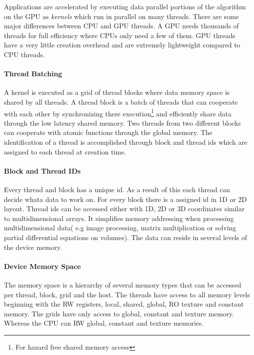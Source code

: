 Applications are accelerated by executing data parallel portions of the
algorithm on the \gls{GPU} as \emph{kernels} which run in parallel on many
threads. There are some major differences between \gls{CPU} and
\gls{GPU} threads. A \gls{GPU} needs thousands of threads for full efficiency
where \glspl{CPU} only need a few of them. \Gls{GPU} threads have a very little
creation overhead and are extremely lightweight compared to \gls{CPU} threads.

\paragraph{Thread Batching}%
\label{par:thread_batching} 
A kernel is executed as a grid of thread blocks where data memory space is
shared by all threads. A thread block is a batch of threads that can cooperate
with each other by synchronizing there execution\footnote{For hazard free shared
memory access} and efficiently share data through the low latency shared
memory. Two threads from two different blocks can cooperate with atomic 
functions through the global memory. The identification of a thread is 
accomplished through block and thread ids which are assigned to each thread at 
creation time. 

\paragraph{Block and Thread IDs}%
\label{par:block_and_thread_ids} 
Every thread and block has a unique id. As a result of this each thread can
decide whata data to work on. For every block there is a assigned id in \gls{1D}
or \gls{2D} layout. Thread ids can be accessed either with \gls{1D}, \gls{2D} or
\gls{3D} coordinates similar to multidimensional arrays. It simplifies memory
addressing when processing multidimensional data( e.g image processing, matrix
multiplication or solving partial differential equations on volumes). The data
can reside in several levels of the device memory. %

\paragraph{Device Memory Space}%
\label{par:device_memory_space} 
The memory space is a hierarchy of several memory types that can be accessed per
thread, block, grid and the host. The threads have access to all memory levels
beginning with the \gls{RW} registers, local, shared, global, \gls{RO}
texture and constant memory. The grids have only access to global, constant
and texture memory. Whereas the \gls{CPU} can \gls{RW} global, constant and texture
memories.

